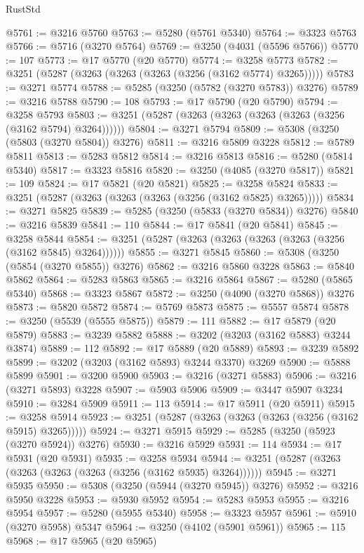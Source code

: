\begin{lexlean}{RustStd}
\begin{coremodule}
@5761 := @3216 @5760
@5763 := @5280 (@5761 @5340)
@5764 := @3323 @5763
@5766 := @5716 (@3270 @5764)
@5769 := @3250 (@4031 (@5596 @5766))
@5770 := 107
@5773 := @17 @5770 (@20 @5770)
@5774 := @3258 @5773
@5782 := @3251 (@5287 (@3263 (@3263 (@3263 (@3256 (@3162 @5774) @3265)))))
@5783 := @3271 @5774
@5788 := @5285 (@3250 (@5782 (@3270 @5783)) @3276)
@5789 := @3216 @5788
@5790 := 108
@5793 := @17 @5790 (@20 @5790)
@5794 := @3258 @5793
@5803 := @3251 (@5287 (@3263 (@3263 (@3263 (@3263 (@3256 (@3162 @5794) @3264))))))
@5804 := @3271 @5794
@5809 := @5308 (@3250 (@5803 (@3270 @5804)) @3276)
@5811 := @3216 @5809 @3228
@5812 := @5789 @5811
@5813 := @5283 @5812
@5814 := @3216 @5813
@5816 := @5280 (@5814 @5340)
@5817 := @3323 @5816
@5820 := @3250 (@4085 (@3270 @5817))
@5821 := 109
@5824 := @17 @5821 (@20 @5821)
@5825 := @3258 @5824
@5833 := @3251 (@5287 (@3263 (@3263 (@3263 (@3256 (@3162 @5825) @3265)))))
@5834 := @3271 @5825
@5839 := @5285 (@3250 (@5833 (@3270 @5834)) @3276)
@5840 := @3216 @5839
@5841 := 110
@5844 := @17 @5841 (@20 @5841)
@5845 := @3258 @5844
@5854 := @3251 (@5287 (@3263 (@3263 (@3263 (@3263 (@3256 (@3162 @5845) @3264))))))
@5855 := @3271 @5845
@5860 := @5308 (@3250 (@5854 (@3270 @5855)) @3276)
@5862 := @3216 @5860 @3228
@5863 := @5840 @5862
@5864 := @5283 @5863
@5865 := @3216 @5864
@5867 := @5280 (@5865 @5340)
@5868 := @3323 @5867
@5872 := @3250 (@4090 (@3270 @5868)) @3276
@5873 := @5820 @5872
@5874 := @5769 @5873
@5875 := @5557 @5874
@5878 := @3250 (@5539 (@5555 @5875))
@5879 := 111
@5882 := @17 @5879 (@20 @5879)
@5883 := @3239 @5882
@5888 := @3202 (@3203 (@3162 @5883) @3244 @3874)
@5889 := 112
@5892 := @17 @5889 (@20 @5889)
@5893 := @3239 @5892
@5899 := @3202 (@3203 (@3162 @5893) @3244 @3370) @3269
@5900 := @5888 @5899
@5901 := @3200 @5900
@5903 := @3216 (@3271 @5883)
@5906 := @3216 (@3271 @5893) @3228
@5907 := @5903 @5906
@5909 := @3447 @5907 @3234
@5910 := @3284 @5909
@5911 := 113
@5914 := @17 @5911 (@20 @5911)
@5915 := @3258 @5914
@5923 := @3251 (@5287 (@3263 (@3263 (@3263 (@3256 (@3162 @5915) @3265)))))
@5924 := @3271 @5915
@5929 := @5285 (@3250 (@5923 (@3270 @5924)) @3276)
@5930 := @3216 @5929
@5931 := 114
@5934 := @17 @5931 (@20 @5931)
@5935 := @3258 @5934
@5944 := @3251 (@5287 (@3263 (@3263 (@3263 (@3263 (@3256 (@3162 @5935) @3264))))))
@5945 := @3271 @5935
@5950 := @5308 (@3250 (@5944 (@3270 @5945)) @3276)
@5952 := @3216 @5950 @3228
@5953 := @5930 @5952
@5954 := @5283 @5953
@5955 := @3216 @5954
@5957 := @5280 (@5955 @5340)
@5958 := @3323 @5957
@5961 := @5910 (@3270 @5958) @5347
@5964 := @3250 (@4102 (@5901 @5961))
@5965 := 115
@5968 := @17 @5965 (@20 @5965)

\end{coremodule}
\end{lexlean}
